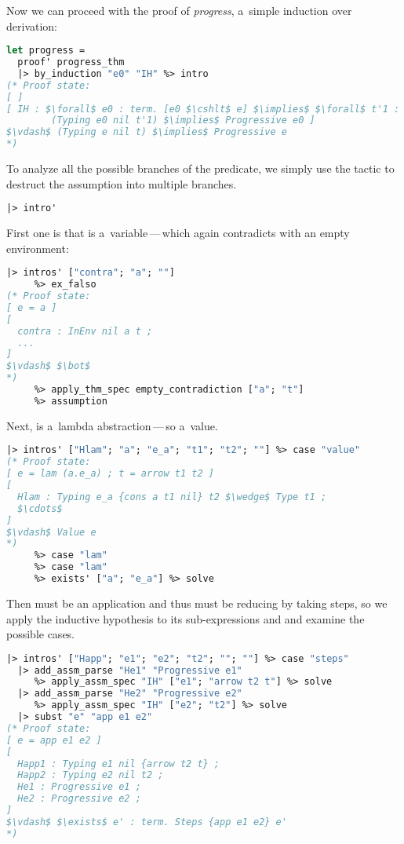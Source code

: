 \documentclass[english, mgr]{iithesis}
\newcommand{\lstt}[1]{\text{{\lstinline[columns=fixed,mathescape]|#1|}}}
\renewcommand{\it}[1]{\textit{#1}}
\newcommand{\mdash}{\,---\,}
\def\-{{\mdash}}
\begin{document}
Now we can proceed with the proof of \it{progress}, a~simple induction over \lstt{Typing} derivation:
\begin{lstlisting}[mathescape,language=OCaml,escapebegin=\color{codegreen}]
let progress =
  proof' progress_thm
  |> by_induction "e0" "IH" %> intro
(* Proof state:
[ ]
[ IH : $\forall$ e0 : term. [e0 $\cshlt$ e] $\implies$ $\forall$ t'1 : term.
        (Typing e0 nil t'1) $\implies$ Progressive e0 ]
$\vdash$ (Typing e nil t) $\implies$ Progressive e
*)
\end{lstlisting}
To analyze all the possible branches of the \lstt{Typing} predicate,
we simply use the \lstt{intro'} tactic to destruct the assumption into multiple branches.
\begin{lstlisting}[language=OCaml]
  |> intro'
\end{lstlisting}
First one is that \lstt{e} is a~variable\-which again contradicts with an empty environment:
\begin{lstlisting}[mathescape,language=OCaml,escapebegin=\color{codegreen}]
  |> intros' ["contra"; "a"; ""]
     %> ex_falso
(* Proof state:
[ e = a ]
[
  contra : InEnv nil a t ;
  ...
]
$\vdash$ $\bot$
*)
     %> apply_thm_spec empty_contradiction ["a"; "t"]
     %> assumption
\end{lstlisting}
Next, \lstt{e} is a~lambda abstraction\-so a~value.
\begin{lstlisting}[mathescape,language=OCaml,escapebegin=\color{codegreen}]
  |> intros' ["Hlam"; "a"; "e_a"; "t1"; "t2"; ""] %> case "value"
(* Proof state:
[ e = lam (a.e_a) ; t = arrow t1 t2 ]
[
  Hlam : Typing e_a {cons a t1 nil} t2 $\wedge$ Type t1 ;
  $\cdots$
]
$\vdash$ Value e
*)
     %> case "lam"
     %> case "lam"
     %> exists' ["a"; "e_a"] %> solve
\end{lstlisting}
Then \lstt{e} must be an application and thus must be reducing by taking steps,
so we apply the inductive hypothesis to its sub-expressions \lstt{e1} and \lstt{e2}
and examine the possible cases.
\begin{lstlisting}[mathescape,language=OCaml,escapebegin=\color{codegreen}]
  |> intros' ["Happ"; "e1"; "e2"; "t2"; ""; ""] %> case "steps"
  |> add_assm_parse "He1" "Progressive e1"
     %> apply_assm_spec "IH" ["e1"; "arrow t2 t"] %> solve
  |> add_assm_parse "He2" "Progressive e2"
     %> apply_assm_spec "IH" ["e2"; "t2"] %> solve
  |> subst "e" "app e1 e2"
(* Proof state:
[ e = app e1 e2 ]
[
  Happ1 : Typing e1 nil {arrow t2 t} ;
  Happ2 : Typing e2 nil t2 ;
  He1 : Progressive e1 ;
  He2 : Progressive e2 ;
]
$\vdash$ $\exists$ e' : term. Steps {app e1 e2} e'
*)
\end{lstlisting}
\end{document}
